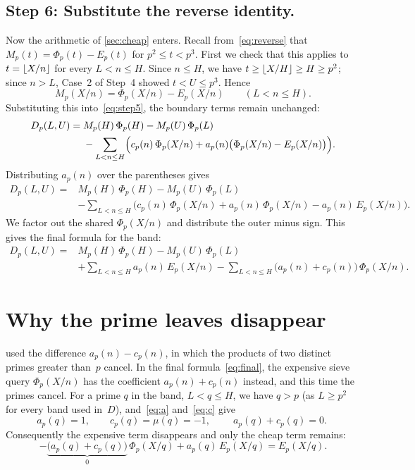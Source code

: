 \documentclass[11pt,a4paper]{amsart}
\numberwithin{equation}{section}
\DeclarePairedDelimiter{\floor}{\lfloor}{\rfloor}
\newcommand{\step}[1]{\subsection*{#1}}
\begin{document}
\step{Step 6: Substitute the reverse identity.}
Now the arithmetic of \cref{sec:cheap} enters. Recall from~\eqref{eq:reverse}
that $M_p(t)=\Phi_p(t)-E_p(t)$ for $p^2\le t<p^3$. First we check that this
applies to $t=\floor{X/n}$ for every $L<n\le H$. Since $n\le H$, we have
$t\ge\floor{X/H}\ge H\ge p^2$; since $n>L$, Case~2 of Step~4 showed $t<U\le
p^3$. Hence
\[
  M_p(X/n)=\Phi_p(X/n)-E_p(X/n)\qquad(L<n\le H).
\]
Substituting this into~\eqref{eq:step5}, the boundary terms remain unchanged:
\[
\begin{split}
  D_p(L,U)={}&M_p(H)\,\Phi_p(H)-M_p(U)\,\Phi_p(L)\\
  &-\sum_{L<n\le H}\Bigl(c_p(n)\,\Phi_p(X/n)
   +a_p(n)\bigl(\Phi_p(X/n)-E_p(X/n)\bigr)\Bigr).
\end{split}
\]
Distributing $a_p(n)$ over the parentheses gives
\[
\begin{split}
  D_p(L,U)={}&M_p(H)\,\Phi_p(H)-M_p(U)\,\Phi_p(L)\\
  &-\sum_{L<n\le H}\bigl(c_p(n)\,\Phi_p(X/n)+a_p(n)\,\Phi_p(X/n)
   -a_p(n)\,E_p(X/n)\bigr).
\end{split}
\]
We factor out the shared $\Phi_p(X/n)$ and distribute the outer minus sign.
This gives the final formula for the band:
\begin{equation}\label{eq:final}
  \boxed{\begin{aligned}
  D_p(L,U)={}&M_p(H)\,\Phi_p(H)-M_p(U)\,\Phi_p(L)\\
  &+\sum_{L<n\le H}a_p(n)\,E_p(X/n)
   -\sum_{L<n\le H}\bigl(a_p(n)+c_p(n)\bigr)\,\Phi_p(X/n).
  \end{aligned}}
\end{equation}

\section{Why the prime leaves disappear}\label{sec:cancel}

 used the difference $a_p(n)-c_p(n)$, in which the products of
two distinct primes greater than~$p$ cancel. In the final
formula~\eqref{eq:final}, the expensive sieve query $\Phi_p(X/n)$ has the
coefficient $a_p(n)+c_p(n)$ instead, and this time the primes cancel. For a
prime $q$ in the band, $L<q\le H$, we have $q>p$ (as $L\ge p^2$ for every band
used in~$D$), and~\eqref{eq:a} and~\eqref{eq:c} give
\begin{equation}\label{eq:primeweight}
  a_p(q)=1,\qquad c_p(q)=\mu(q)=-1,\qquad
  \boxed{\;a_p(q)+c_p(q)=0.\;}
\end{equation}
Consequently the expensive term disappears and only the cheap term remains:
\[
  -\underbrace{\bigl(a_p(q)+c_p(q)\bigr)}_{0}\,\Phi_p(X/q)+a_p(q)\,E_p(X/q)
  =E_p(X/q).
\]
\end{document}
